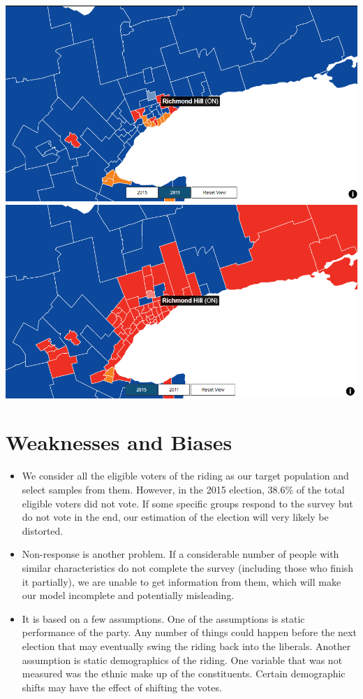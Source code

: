 \documentclass[
]{article}
\begin{document}
\includegraphics{img/2011_riding_map.png}
\includegraphics{img/2015_riding_map.png}

\hypertarget{weaknesses-and-biases}{%
\section{Weaknesses and Biases}\label{weaknesses-and-biases}}

\begin{itemize}
\item
  We consider all the eligible voters of the riding as our target
  population and select samples from them. However, in the 2015
  election, 38.6\% of the total eligible voters did not vote. If some
  specific groups respond to the survey but do not vote in the end, our
  estimation of the election will very likely be distorted.
\item
  Non-response is another problem. If a considerable number of people
  with similar characteristics do not complete the survey (including
  those who finish it partially), we are unable to get information from
  them, which will make our model incomplete and potentially misleading.
\item
  It is based on a few assumptions. One of the assumptions is static
  performance of the party. Any number of things could happen before the
  next election that may eventually swing the riding back into the
  liberals. Another assumption is static demographics of the riding. One
  variable that was not measured was the ethnic make up of the
  constituents. Certain demographic shifts may have the effect of
  shifting the votes.
\end{itemize}
\end{document}
